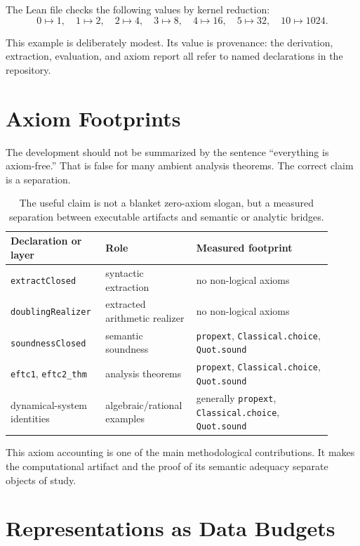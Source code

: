 \documentclass[11pt,a4paper]{article}
\theoremstyle{definition}
\theoremstyle{remark}
\newcommand{\lean}[1]{\texttt{\nolinkurl{#1}}}
\begin{document}
The Lean file checks the following values by kernel reduction:
\[
0\mapsto 1,\quad
1\mapsto 2,\quad
2\mapsto 4,\quad
3\mapsto 8,\quad
4\mapsto 16,\quad
5\mapsto 32,\quad
10\mapsto 1024 .
\]

This example is deliberately modest.  Its value is provenance: the derivation,
extraction, evaluation, and axiom report all refer to named declarations in
the repository.

\section{Axiom Footprints}

The development should not be summarized by the sentence ``everything is
axiom-free.''  That is false for many ambient analysis theorems.  The correct
claim is a separation.

\begin{table}[htbp]
\centering
\begin{tabular}{p{0.26\linewidth}p{0.25\linewidth}p{0.40\linewidth}}
\toprule
\textbf{Declaration or layer} & \textbf{Role} & \textbf{Measured footprint} \\
\midrule
\lean{extractClosed} & syntactic extraction & no non-logical axioms \\
\lean{doublingRealizer} & extracted arithmetic realizer & no non-logical axioms \\
\lean{soundnessClosed} & semantic soundness & \lean{propext}, \lean{Classical.choice}, \lean{Quot.sound} \\
\lean{eftc1}, \lean{eftc2_thm} & analysis theorems & \lean{propext}, \lean{Classical.choice}, \lean{Quot.sound} \\
dynamical-system identities & algebraic/rational examples & generally \lean{propext}, \lean{Classical.choice}, \lean{Quot.sound} \\
\bottomrule
\end{tabular}
\caption{The useful claim is not a blanket zero-axiom slogan, but a measured
separation between executable artifacts and semantic or analytic bridges.}
\end{table}

This axiom accounting is one of the main methodological contributions.  It
makes the computational artifact and the proof of its semantic adequacy
separate objects of study.

\section{Representations as Data Budgets}
\end{document}
